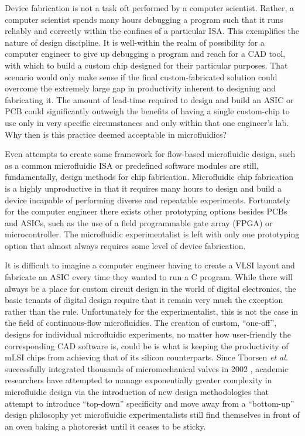 Device fabrication is not a task oft performed by a computer scientist. Rather, a computer scientist spends many hours debugging a program such that it runs reliably and correctly within the confines of a particular ISA. This exemplifies the nature of design discipline. It is well-within the realm of possibility for a computer engineer to give up debugging a program and reach for a CAD tool, with which to build a custom chip designed for their particular purposes. That scenario would only make sense if the final custom-fabricated solution could overcome the extremely large gap in productivity inherent to designing and fabricating it. The amount of lead-time required to design and build an ASIC or PCB could significantly outweigh the benefits of having a single custom-chip to use only in very specific circumstances and only within that one engineer's lab. Why then is this practice deemed acceptable in microfluidics?

Even attempts to create some framework for flow-based microfluidic design, such as a common microfluidic ISA\cite{amin2009} or predefined software modules \cite{soe2013} are still, fundamentally, design methods for chip fabrication. Microfluidic chip fabrication is a highly unproductive in that it requires many hours to design and build a device incapable of performing diverse and repeatable experiments. Fortunately for the computer engineer there exists other prototyping options besides PCBs and ASICs, such as the use of a field programmable gate array (FPGA) or microcontroller. The microfluidic experimentalist is left with only one prototyping option that almost always requires some level of device
fabrication.


It is difficult to imagine a computer engineer having to create a VLSI layout and fabricate an ASIC every time they wanted to run a C program. While there will always be a place for custom circuit design in the world of digital electronics, the basic tenants of digital design require that it remain very much the exception rather than the rule. Unfortunately for the experimentalist, this is not the case in the field of continuous-flow microfluidics. The creation of custom, ``one-off'', designs for individual microfluidic experiments, no matter how user-friendly the corresponding CAD software is, could be is what is keeping the productivity of mLSI chips from achieving that of its silicon counterparts. Since Thorsen \emph{et al.} successfully integrated thousands of micromechanical valves in 2002 \cite{thorsen2002}, academic researchers have attempted to manage exponentially greater complexity in microfluidic design via the introduction of new design methodologies that attempt to introduce ``top-down'' specificity and move away from a ``bottom-up'' design philosophy \cite{minhass2013}\cite{melin2007}\cite{minhass2012} yet microfluidic experimentalists still find themselves in front of an oven baking a photoresist until it ceases to be sticky. 

